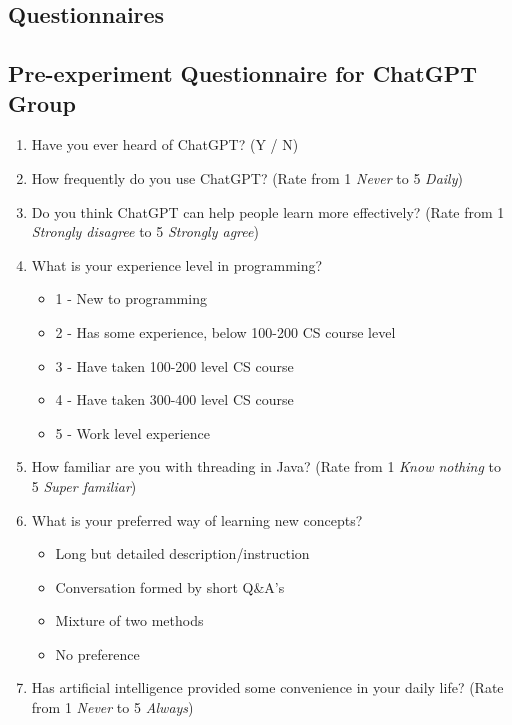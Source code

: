 \documentclass[manuscript,screen,nonacm]{acmart}
\begin{document}
\appendix
\begin{appendices}

\section{Questionnaires}\label{preQs}
\subsection{Pre-experiment Questionnaire for ChatGPT Group}\label{ChatGPTpre}
\begin{enumerate}
    \item Have you ever heard of ChatGPT? (Y / N)
    \item How frequently do you use ChatGPT? (Rate from 1 \textit{Never} to 5 \textit{Daily})
    \item Do you think ChatGPT can help people learn more effectively? (Rate from 1 \textit{Strongly disagree} to 5 \textit{Strongly agree})
    \item What is your experience level in programming? 
        \begin{itemize}
            \item 1 - New to programming
            \item 2 - Has some experience, below 100-200 CS course level
            \item 3 - Have taken 100-200 level CS course
            \item 4 - Have taken 300-400 level CS course
            \item 5 - Work level experience
        \end{itemize}
    \item How familiar are you with threading in Java? (Rate from 1 \textit{Know nothing} to 5 \textit{Super familiar})
    \item What is your preferred way of learning new concepts?
        \begin{itemize}
            \item Long but detailed description/instruction
            \item Conversation formed by short Q\&A's
            \item Mixture of two methods
            \item No preference
        \end{itemize}
    \item Has artificial intelligence provided some convenience in your daily life? (Rate from 1 \textit{Never} to 5 \textit{Always})
\end{enumerate}


\end{appendices}
\end{document}

